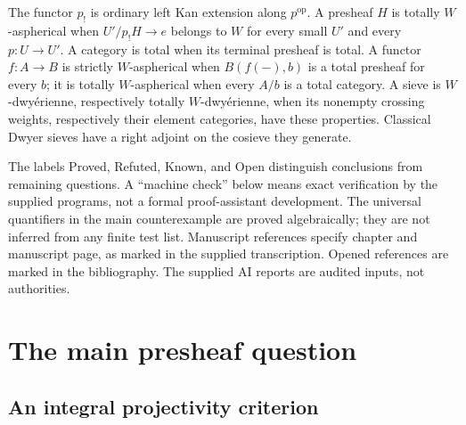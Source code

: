 \documentclass[11pt,a4paper]{article}
\theoremstyle{definition}
\theoremstyle{remark}
\newcommand{\op}{\mathrm{op}}
\begin{document}
The functor $p_!$ is ordinary left Kan extension along $p^{\op}$. A presheaf $H$ is totally $W$-aspherical when $U'/p_!H\to e$ belongs to $W$ for every small $U'$ and every $p:U\to U'$. A category is total when its terminal presheaf is total. A functor $f:A\to B$ is strictly $W$-aspherical when $B(f(-),b)$ is a total presheaf for every $b$; it is totally $W$-aspherical when every $A/b$ is a total category. A sieve is $W$-dwy\'erienne, respectively totally $W$-dwy\'erienne, when its nonempty crossing weights, respectively their element categories, have these properties. Classical Dwyer sieves have a right adjoint on the cosieve they generate.

The labels Proved, Refuted, Known, and Open distinguish conclusions from remaining questions. A ``machine check'' below means exact verification by the supplied programs, not a formal proof-assistant development. The universal quantifiers in the main counterexample are proved algebraically; they are not inferred from any finite test list. Manuscript references specify chapter and manuscript page, as marked in the supplied transcription. Opened references are marked in the bibliography. The supplied AI reports are audited inputs, not authorities.

\section{The main presheaf question}

\subsection{An integral projectivity criterion}
\end{document}
